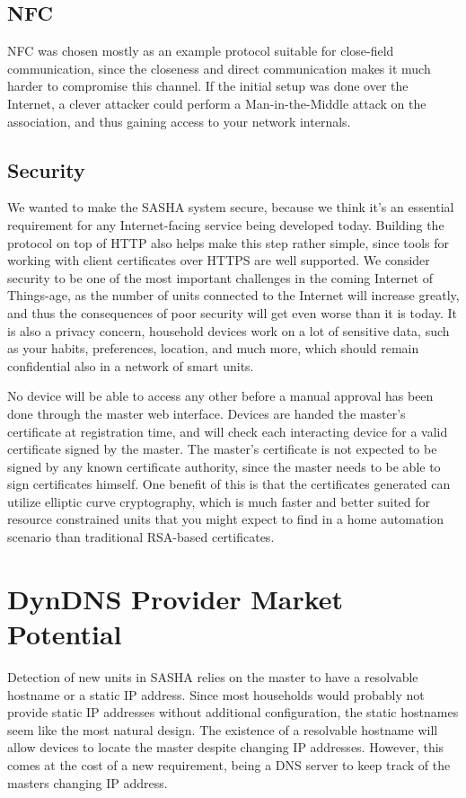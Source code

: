 \subsection{NFC}
NFC was chosen mostly as an example protocol suitable for close-field communication, since the closeness and direct communication makes it much harder to compromise this channel. If the initial setup was done over the Internet, a clever attacker could perform a Man-in-the-Middle attack on the association, and thus gaining access to your network internals.

\subsection{Security}
We wanted to make the SASHA system secure, because we think it's an essential requirement for any Internet-facing service being developed today. Building the protocol on top of HTTP also helps make this step rather simple, since tools for working with client certificates over HTTPS are well supported. We consider security to be one of the most important challenges in the coming Internet of Things-age, as the number of units connected to the Internet will increase greatly, and thus the consequences of poor security will get even worse than it is today. It is also a privacy concern, household devices work on a lot of sensitive data, such as your habits, preferences, location, and much more, which should remain confidential also in a network of smart units.

No device will be able to access any other before a manual approval has been done through the master web interface. Devices are handed the master's certificate at registration time, and will check each interacting device for a valid certificate signed by the master. The master's certificate is not expected to be signed by any known certificate authority, since the master needs to be able to sign certificates himself. One benefit of this is that the certificates generated can utilize elliptic curve cryptography, which is much faster and better suited for resource constrained units that you might expect to find in a home automation scenario than traditional RSA-based certificates.


\section{DynDNS Provider Market Potential}
Detection of new units in SASHA relies on the master to have a resolvable hostname or a static IP address. Since most households would probably not provide static IP addresses without additional configuration, the static hostnames seem like the most natural design.
The existence of a resolvable hostname will allow devices to locate the master despite changing IP addresses. However, this comes at the cost of a new requirement, being a DNS server to keep track of the masters changing IP address.

